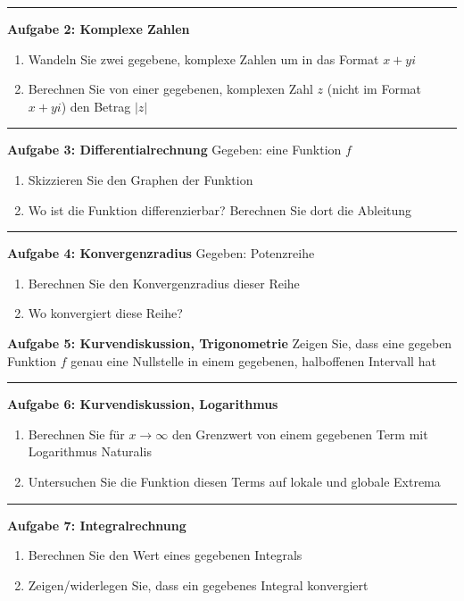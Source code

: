 \bigskip \hrule \bigskip

\noindent \textbf{Aufgabe 2: Komplexe Zahlen}
\begin{enumerate}[label=(\alph*)]
\item Wandeln Sie zwei gegebene, komplexe Zahlen um in das Format $x+yi$
\item Berechnen Sie von einer gegebenen, komplexen Zahl $z$ (nicht im Format $x+yi$) den Betrag $|z|$
\end{enumerate}

\bigskip \hrule \bigskip

\noindent \textbf{Aufgabe 3: Differentialrechnung}\newline
Gegeben: eine Funktion $f$
\begin{enumerate}[label=(\alph*)]
\item Skizzieren Sie den Graphen der Funktion
\item Wo ist die Funktion differenzierbar? Berechnen Sie dort die Ableitung
\end{enumerate}

\bigskip \hrule \bigskip

\noindent \textbf{Aufgabe 4: Konvergenzradius}\newline
Gegeben: Potenzreihe
\begin{enumerate}[label=(\alph*)]
\item Berechnen Sie den Konvergenzradius dieser Reihe
\item Wo konvergiert diese Reihe?
\end{enumerate}

\newpage

\noindent \textbf{Aufgabe 5: Kurvendiskussion, Trigonometrie}\newline
Zeigen Sie, dass eine gegeben Funktion $f$ genau eine Nullstelle in einem gegebenen, halboffenen Intervall hat

\bigskip \hrule \bigskip

\noindent \textbf{Aufgabe 6: Kurvendiskussion, Logarithmus}
\begin{enumerate}[label=(\alph*)]
\item Berechnen Sie für $x \to \infty$ den Grenzwert von einem gegebenen Term mit Logarithmus Naturalis
\item Untersuchen Sie die Funktion diesen Terms auf lokale und globale Extrema
\end{enumerate}

\bigskip \hrule \bigskip

\noindent \textbf{Aufgabe 7: Integralrechnung}
\begin{enumerate}[label=(\alph*)]
\item Berechnen Sie den Wert eines gegebenen Integrals
\item Zeigen/widerlegen Sie, dass ein gegebenes Integral konvergiert
\end{enumerate}

